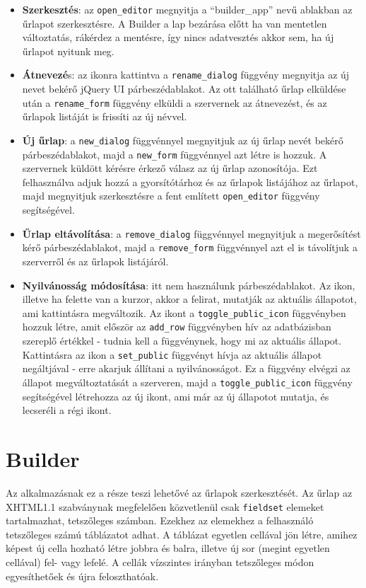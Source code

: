 \documentclass[12pt,a4paper,twoside]{article}
\begin{document}
\begin{itemize}
\item \textbf{Szerkesztés}: az \texttt{open\_editor} megnyitja a ``builder\_app'' nevű ablakban az űrlapot
  szerkesztésre. A Builder a lap bezárása előtt ha van mentetlen változtatás,
  rákérdez a mentésre, így nincs adatvesztés akkor sem, ha új űrlapot nyitunk meg.
\item \textbf{Átnevezé}s: az ikonra kattintva a \texttt{rename\_dialog} függvény megnyitja
  az új nevet bekérő jQuery UI párbeszédablakot. Az ott található űrlap
  elküldése után a \texttt{rename\_form} függvény elküldi a szervernek az
  átnevezést, és az űrlapok listáját is frissíti az új névvel.
\item \textbf{Új űrlap}: a \texttt{new\_dialog} függvénnyel megnyitjuk az új űrlap nevét
  bekérő párbeszédablakot, majd a \texttt{new\_form} függvénnyel azt létre is
  hozzuk. A szervernek küldött kérésre érkező válasz az új űrlap
  azonosítója. Ezt felhasználva adjuk hozzá a gyorsítótárhoz és az űrlapok
  listájához az űrlapot, majd megnyitjuk szerkesztésre a fent említett
  \texttt{open\_editor} függvény segítségével.
\item \textbf{Űrlap eltávolítása}: a \texttt{remove\_dialog} függvénnyel megnyitjuk a
  megerősítést kérő párbeszédablakot, majd a \texttt{remove\_form} függvénnyel
  azt el is távolítjuk a szerverről és az űrlapok listájáról.
\item \textbf{Nyilvánosság módosítása}: itt nem használunk párbeszédablakot. Az ikon,
  illetve ha felette van a kurzor, akkor a felirat, mutatják az aktuális
  állapotot, ami kattintásra megváltozik. Az ikont a
  \texttt{toggle\_public\_icon} függvényben hozzuk létre, amit először az \texttt{add\_row}
  függvényben hív az adatbázisban szereplő értékkel - tudnia kell a függvénynek,
  hogy mi az aktuális állapot. Kattintásra az ikon a \texttt{set\_public}
  függvényt hívja az aktuális állapot negáltjával - erre akarjuk állítani a
  nyilvánosságot. Ez a függvény elvégzi az állapot megváltoztatását a szerveren,
  majd a \texttt{toggle\_public\_icon} függvény segítségével létrehozza az új
  ikont, ami már az új állapotot mutatja, és lecseréli a régi ikont.
\end{itemize}


\section{Builder}

Az alkalmazásnak ez a része teszi lehetővé az űrlapok szerkesztését.
Az űrlap az XHTML1.1 szabványnak megfelelően közvetlenül csak \texttt{fieldset}
elemeket tartalmazhat, tetszőleges számban. Ezekhez az elemekhez a felhasználó
tetszőleges számú táblázatot adhat. A táblázat egyetlen cellával jön létre,
amihez képest új cella hozható létre jobbra és balra, illetve új sor (megint
egyetlen cellával) fel- vagy lefelé. A cellák vízszintes irányban tetszőleges
módon egyesíthetőek és újra feloszthatóak.
\end{document}
